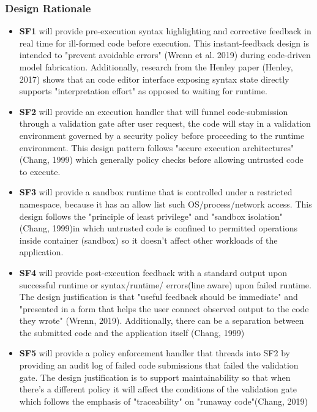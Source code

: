 \documentclass{article}
\begin{document}
\subsubsection{Design Rationale}
\begin{itemize}
\item \textbf{SF1} will provide pre-execution syntax highlighting and corrective feedback in real time for ill-formed code before execution. This instant-feedback design is intended to "prevent avoidable errors" (Wrenn et al. 2019) during code-driven model fabrication. Additionally, research from the Henley paper (Henley, 2017) shows that an code editor interface exposing syntax state directly supports "interpretation effort" as opposed to waiting for runtime.\\

\item \textbf{SF2} will provide an execution handler that will funnel code-submission through a validation gate after user request, the code will stay in a validation environment governed by a security policy before proceeding to the runtime environment. This design pattern follows "secure execution architectures"(Chang, 1999) which generally policy checks before allowing untrusted code to execute. \\

\item \textbf{SF3} will provide a sandbox runtime that is controlled under a restricted namespace, because it has an allow list such OS/process/network access. This design follows the "principle of least privilege" and "sandbox isolation" (Chang, 1999)in which untrusted code is confined to permitted operations inside container (sandbox) so it doesn't affect other workloads of the application. \\

\item \textbf{SF4} will provide post-execution feedback with a standard output upon successful runtime or syntax/runtime/ errors(line aware) upon failed runtime. The design justification is that "useful feedback should be immediate" and "presented in a form that helps the user connect observed output to the code they wrote" (Wrenn, 2019). Additionally, there can be a separation between the submitted code and the application itself (Chang, 1999)\\
\item \textbf{SF5} will provide a policy enforcement handler that threads into SF2 by providing an audit log of failed code submissions that failed the validation gate. The design justification is to support maintainability so that when there's a different policy it will affect the conditions of the validation gate which follows the emphasis of "traceability" on "runaway code"(Chang, 2019) \\
\end{itemize}
\end{document}
